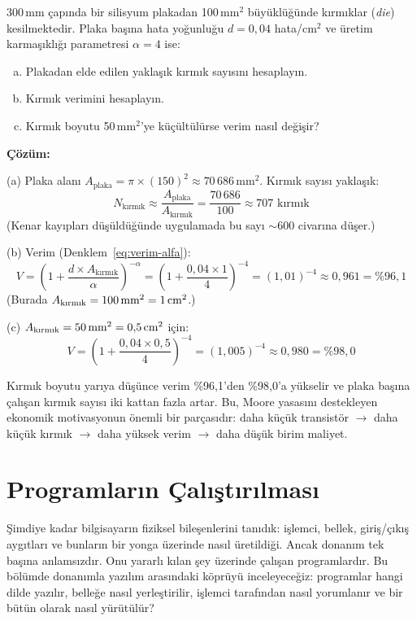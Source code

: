 \begin{ornek}[1.4]
\label{orn:verim-hesaplama}
300\,mm çapında bir silisyum plakadan 100\,mm$^2$ büyüklüğünde kırmıklar (\emph{die}) kesilmektedir. Plaka başına hata yoğunluğu $d = 0{,}04$ hata/cm$^2$ ve üretim karmaşıklığı parametresi $\alpha = 4$ ise:
\begin{enumerate}[(a)]
\item Plakadan elde edilen yaklaşık kırmık sayısını hesaplayın.
\item Kırmık verimini hesaplayın.
\item Kırmık boyutu 50\,mm$^2$'ye küçültülürse verim nasıl değişir?
\end{enumerate}

\textbf{Çözüm:}

(a) Plaka alanı $A_{\text{plaka}} = \pi \times (150)^2 \approx 70\,686$\,mm$^2$. Kırmık sayısı yaklaşık:
\[
N_{\text{kırmık}} \approx \frac{A_{\text{plaka}}}{A_{\text{kırmık}}} = \frac{70\,686}{100} \approx 707 \text{ kırmık}
\]
(Kenar kayıpları düşüldüğünde uygulamada bu sayı $\sim$600 civarına düşer.)

(b) Verim (Denklem~\ref{eq:verim-alfa}):
\[
V = \left(1 + \frac{d \times A_{\text{kırmık}}}{\alpha}\right)^{-\alpha} = \left(1 + \frac{0{,}04 \times 1}{4}\right)^{-4} = (1{,}01)^{-4} \approx 0{,}961 = \%96{,}1
\]
(Burada $A_{\text{kırmık}} = 100\text{\,mm}^2 = 1\text{\,cm}^2$.)

(c) $A_{\text{kırmık}} = 50\text{\,mm}^2 = 0{,}5\text{\,cm}^2$ için:
\[
V = \left(1 + \frac{0{,}04 \times 0{,}5}{4}\right)^{-4} = (1{,}005)^{-4} \approx 0{,}980 = \%98{,}0
\]

Kırmık boyutu yarıya düşünce verim \%96,1'den \%98,0'a yükselir ve plaka başına çalışan kırmık sayısı iki kattan fazla artar. Bu, Moore yasasını destekleyen ekonomik motivasyonun önemli bir parçasıdır: daha küçük transistör $\rightarrow$ daha küçük kırmık $\rightarrow$ daha yüksek verim $\rightarrow$ daha düşük birim maliyet.
\end{ornek}


\section{Programların Çalıştırılması}
\label{sec:program-calistirma}

Şimdiye kadar bilgisayarın fiziksel bileşenlerini tanıdık: işlemci, bellek, giriş/çıkış aygıtları ve bunların bir yonga üzerinde nasıl üretildiği. Ancak donanım tek başına anlamsızdır. Onu yararlı kılan şey üzerinde çalışan programlardır. Bu bölümde donanımla yazılım arasındaki köprüyü inceleyeceğiz: programlar hangi dilde yazılır, belleğe nasıl yerleştirilir, işlemci tarafından nasıl yorumlanır ve bir bütün olarak nasıl yürütülür?

